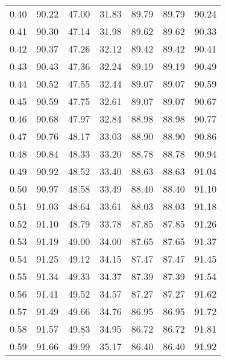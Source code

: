 \begin{tabular}{|c|c|c|c|c|c|c|}
      0.40 &     90.22 &     47.00 &      31.83 &   89.79 &      89.79 &         90.24 \\
      0.41 &     90.30 &     47.14 &      31.98 &   89.62 &      89.62 &         90.33 \\
      0.42 &     90.37 &     47.26 &      32.12 &   89.42 &      89.42 &         90.41 \\
      0.43 &     90.43 &     47.36 &      32.24 &   89.19 &      89.19 &         90.49 \\
      0.44 &     90.52 &     47.55 &      32.44 &   89.07 &      89.07 &         90.59 \\
      0.45 &     90.59 &     47.75 &      32.61 &   89.07 &      89.07 &         90.67 \\
      0.46 &     90.68 &     47.97 &      32.84 &   88.98 &      88.98 &         90.77 \\
      0.47 &     90.76 &     48.17 &      33.03 &   88.90 &      88.90 &         90.86 \\
      0.48 &     90.84 &     48.33 &      33.20 &   88.78 &      88.78 &         90.94 \\
      0.49 &     90.92 &     48.52 &      33.40 &   88.63 &      88.63 &         91.04 \\
      0.50 &     90.97 &     48.58 &      33.49 &   88.40 &      88.40 &         91.10 \\
      0.51 &     91.03 &     48.64 &      33.61 &   88.03 &      88.03 &         91.18 \\
      0.52 &     91.10 &     48.79 &      33.78 &   87.85 &      87.85 &         91.26 \\
      0.53 &     91.19 &     49.00 &      34.00 &   87.65 &      87.65 &         91.37 \\
      0.54 &     91.25 &     49.12 &      34.15 &   87.47 &      87.47 &         91.45 \\
      0.55 &     91.34 &     49.33 &      34.37 &   87.39 &      87.39 &         91.54 \\
      0.56 &     91.41 &     49.52 &      34.57 &   87.27 &      87.27 &         91.62 \\
      0.57 &     91.49 &     49.66 &      34.76 &   86.95 &      86.95 &         91.72 \\
      0.58 &     91.57 &     49.83 &      34.95 &   86.72 &      86.72 &         91.81 \\
      0.59 &     91.66 &     49.99 &      35.17 &   86.40 &      86.40 &         91.92 \\

\end{tabular}
